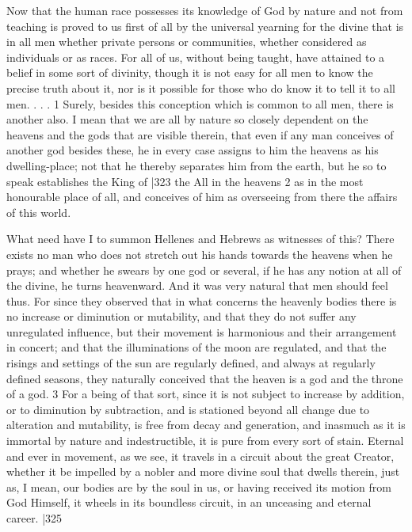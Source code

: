 Now that the human race possesses its knowledge of God by nature and not from teaching is proved to us first of all by the universal yearning for the divine that is in all men whether private persons or communities, whether considered as individuals or as races. For all of us, without being taught, have attained to a belief in some sort of divinity, though it is not easy for all men to know the precise truth about it, nor is it possible for those who do know it to tell it to all men. . . . 1 Surely, besides this conception which is common to all men, there is another also. I mean that we are all by nature so closely dependent on the heavens and the gods that are visible therein, that even if any man conceives of another god besides these, he in every case assigns to him the heavens as his dwelling-place; not that he thereby separates him from the earth, but he so to speak establishes the King of
|323 the All in the heavens 2 \emph{}as in the most honourable place of all, and conceives of him as overseeing from there the affairs of this world.

What need have I to summon Hellenes and Hebrews as witnesses of this? There exists no man who does not stretch out his hands towards the heavens when he prays; and whether he swears by one god or several, if he has any notion at all of the divine, he turns heavenward. And it was very natural that men should feel thus. For since they observed that in what concerns the heavenly bodies there is no increase or diminution or mutability, and that they do not suffer any unregulated influence, but their movement is harmonious and their arrangement in concert; and that the illuminations of the moon are regulated, and that the risings and settings of the sun are regularly defined, and always at regularly defined seasons, they naturally conceived that the heaven is a god and the throne of a god. 3 For a being of that sort, since it is not subject to increase by addition, or to diminution by subtraction, and is stationed beyond all change due to alteration and mutability, is free from decay and generation, and inasmuch as it is immortal by nature and indestructible, it is pure from every sort of stain. Eternal and ever in movement, as we see, it travels in a circuit about the great Creator, whether it be impelled by a nobler and more divine soul that dwells therein, just as, I mean, our bodies are by the soul in us, or having received its motion from God Himself, it wheels in its boundless circuit, in an unceasing and eternal career.
|325

